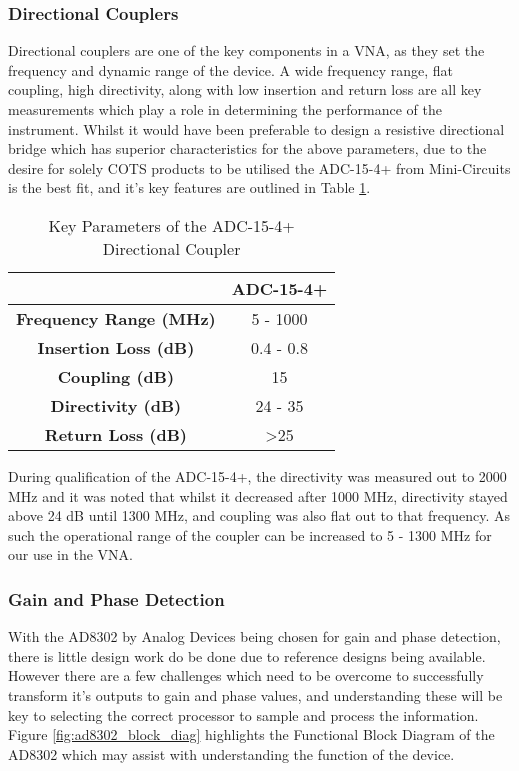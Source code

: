 \subsubsection{Directional Couplers}
Directional couplers are one of the key components in a VNA, as they set the frequency and dynamic range of the device. A wide frequency range, flat coupling, high directivity, along with low insertion and return loss are all key measurements which play a role in determining the performance of the instrument. Whilst it would have been preferable to design a resistive directional bridge which has superior characteristics for the above parameters, due to the desire for solely COTS products to be utilised the ADC-15-4+ from Mini-Circuits is the best fit, and it's key features are outlined in Table \ref{table:coupler}. 
\begin{table}[H]
	\caption{Key Parameters of the ADC-15-4+ Directional Coupler}
	\label{table:coupler}
	\centering
\begin{tabular}{|c|c|}
	\hline
	\multicolumn{1}{|l|}{}         & \textbf{ADC-15-4+} \\ \hline
	\textbf{Frequency Range (MHz)} & 5 - 1000           \\ \hline
	\textbf{Insertion Loss (dB)}   & 0.4 - 0.8          \\ \hline
	\textbf{Coupling (dB)}         & 15                 \\ \hline
	\textbf{Directivity (dB)}      & 24 - 35            \\ \hline
	\textbf{Return Loss (dB)}      & \textgreater 25    \\ \hline
\end{tabular}
\end{table}
\vspace{-1em}
During qualification of the ADC-15-4+, the directivity was measured out to 2000 MHz and it was noted that whilst it decreased after 1000 MHz, directivity stayed above 24 dB until 1300 MHz, and coupling was also flat out to that frequency. As such the operational range of the coupler can be increased to 5 - 1300 MHz for our use in the VNA. 

\subsubsection{Gain and Phase Detection}
With the AD8302 by Analog Devices being chosen for gain and phase detection, there is little design work do be done due to reference designs being available. However there are a few challenges which need to be overcome to successfully transform it's outputs to gain and phase values, and understanding these will be key to selecting the correct processor to sample and process the information. Figure \ref{fig:ad8302_block_diag} highlights the Functional Block Diagram of the AD8302 which may assist with understanding the function of the device. 

